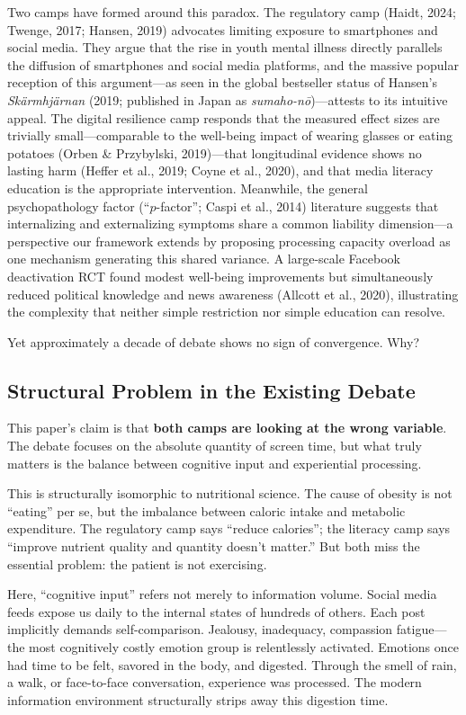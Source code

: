 \documentclass[a4paper,11pt,titlepage]{article}
\begin{document}
Two camps have formed around this paradox. The regulatory camp (Haidt, 2024; Twenge, 2017; Hansen, 2019) advocates limiting exposure to smartphones and social media. They argue that the rise in youth mental illness directly parallels the diffusion of smartphones and social media platforms, and the massive popular reception of this argument---as seen in the global bestseller status of Hansen's \textit{Sk\"armhj\"arnan} (2019; published in Japan as \textit{sumaho-n\=o})---attests to its intuitive appeal. The digital resilience camp responds that the measured effect sizes are trivially small---comparable to the well-being impact of wearing glasses or eating potatoes (Orben \& Przybylski, 2019)---that longitudinal evidence shows no lasting harm (Heffer et al., 2019; Coyne et al., 2020), and that media literacy education is the appropriate intervention. Meanwhile, the general psychopathology factor (``$p$-factor''; Caspi et al., 2014) literature suggests that internalizing and externalizing symptoms share a common liability dimension---a perspective our framework extends by proposing processing capacity overload as one mechanism generating this shared variance. A large-scale Facebook deactivation RCT found modest well-being improvements but simultaneously reduced political knowledge and news awareness (Allcott et al., 2020), illustrating the complexity that neither simple restriction nor simple education can resolve.

Yet approximately a decade of debate shows no sign of convergence. Why?

\subsection{Structural Problem in the Existing Debate}

This paper's claim is that \textbf{both camps are looking at the wrong variable}. The debate focuses on the absolute quantity of screen time, but what truly matters is the balance between cognitive input and experiential processing.

This is structurally isomorphic to nutritional science. The cause of obesity is not ``eating'' per se, but the imbalance between caloric intake and metabolic expenditure. The regulatory camp says ``reduce calories''; the literacy camp says ``improve nutrient quality and quantity doesn't matter.'' But both miss the essential problem: the patient is not exercising.

Here, ``cognitive input'' refers not merely to information volume. Social media feeds expose us daily to the internal states of hundreds of others. Each post implicitly demands self-comparison. Jealousy, inadequacy, compassion fatigue---the most cognitively costly emotion group is relentlessly activated. Emotions once had time to be felt, savored in the body, and digested. Through the smell of rain, a walk, or face-to-face conversation, experience was processed. The modern information environment structurally strips away this digestion time.
\end{document}
